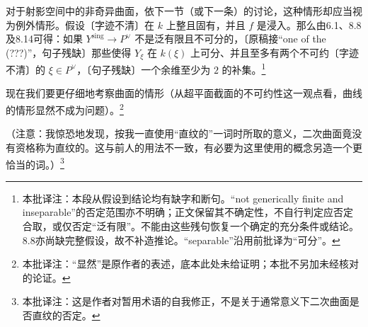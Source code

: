 \documentclass[openany]{ctexbook}
\newcommand{\note}[1]{\footnote{本批译注：#1}}
\begin{document}
对于射影空间中的非奇异曲面，依下一节（或下一条）的讨论，这种情形却应当视为例外情形。假设〔字迹不清〕在 $k$ 上整且固有，并且 $f$ 是浸入。那么由6.1、8.8及8.14可得：如果 $Y^{\mathrm{sing}}\to P^\vee$ 不是泛有限且不可分的，〔原稿接“one of the (???)”，句子残缺〕那些使得 $Y_\xi$ 在 $k(\xi)$ 上可分、并且至多有两个不可约〔字迹不清〕的 $\xi\in P^\vee$，〔句子残缺〕一个余维至少为 $2$ 的补集。\note{本段从假设到结论均有缺字和断句。“not generically finite and inseparable”的否定范围亦不明确；正文保留其不确定性，不自行判定应否定合取，或仅否定“泛有限”。不能由这些残句恢复一个确定的充分条件或结论。8.8亦尚缺完整假设，故不补造推论。“separable”沿用前批译为“可分”。}

现在我们要更仔细地考察曲面的情形（从超平面截面的不可约性这一观点看，曲线的情形显然不成为问题）。\note{“显然”是原作者的表述，底本此处未给证明；本批不另加未经核对的论证。}

（注意：我惊恐地发现，按我一直使用“直纹的”一词时所取的意义，二次曲面竟没有资格称为直纹的。这与前人的用法不一致，有必要为这里使用的概念另造一个更恰当的词。）\note{这是作者对暂用术语的自我修正，不是关于通常意义下二次曲面是否直纹的否定。}
\end{document}
